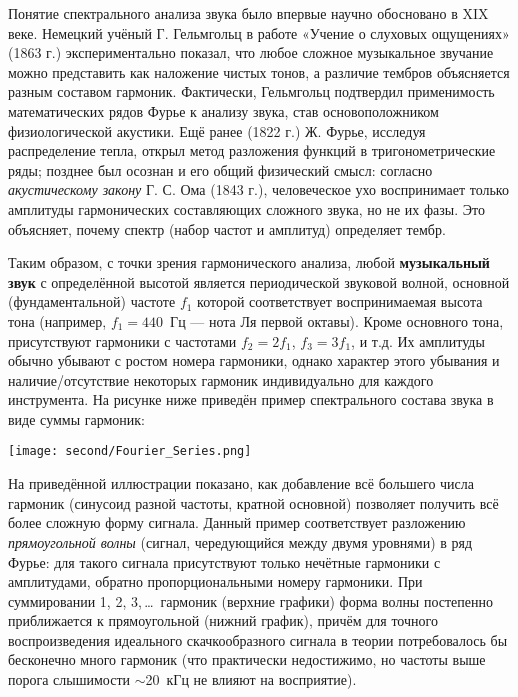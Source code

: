 \documentclass[bachelor, och, diploma]{SCWorks}
\begin{document}
Понятие спектрального анализа звука было впервые научно обосновано в XIX веке. Немецкий учёный Г. Гельмгольц в работе «Учение о слуховых ощущениях» (1863 г.) экспериментально показал, что любое сложное музыкальное звучание можно представить как наложение чистых тонов, а различие тембров объясняется разным составом гармоник\cite{helmholtz}. Фактически, Гельмгольц подтвердил применимость математических рядов Фурье к анализу звука, став основоположником физиологической акустики. Ещё ранее (1822 г.) Ж. Фурье, исследуя распределение тепла, открыл метод разложения функций в тригонометрические ряды; позднее был осознан и его общий физический смысл: согласно \textit{акустическому закону} Г. С. Ома (1843 г.), человеческое ухо воспринимает только амплитуды гармонических составляющих сложного звука, но не их фазы\cite{opp-dsp}. Это объясняет, почему спектр (набор частот и амплитуд) определяет тембр.

Таким образом, с точки зрения гармонического анализа, любой \textbf{музыкальный звук} с определённой высотой является периодической звуковой волной, основной (фундаментальной) частоте $f_1$ которой соответствует воспринимаемая высота тона (например, $f_1=440$~Гц --- нота Ля первой октавы). Кроме основного тона, присутствуют гармоники с частотами $f_2=2f_1$, $f_3=3f_1$, и т.д. Их амплитуды обычно убывают с ростом номера гармоники, однако характер этого убывания и наличие/отсутствие некоторых гармоник индивидуально для каждого инструмента. На рисунке ниже приведён пример спектрального состава звука в виде суммы гармоник:
\begin{center}
\texttt{[image: second/Fourier\_Series.png]}
\end{center}

На приведённой иллюстрации показано, как добавление всё большего числа гармоник (синусоид разной частоты, кратной основной) позволяет получить всё более сложную форму сигнала. Данный пример соответствует разложению \textit{прямоугольной волны} (сигнал, чередующийся между двумя уровнями) в ряд Фурье: для такого сигнала присутствуют только нечётные гармоники с амплитудами, обратно пропорциональными номеру гармоники\cite{opp-dsp}. При суммировании 1, 2, 3,\,\dots\, гармоник (верхние графики) форма волны постепенно приближается к прямоугольной (нижний график), причём для точного воспроизведения идеального скачкообразного сигнала в теории потребовалось бы бесконечно много гармоник (что практически недостижимо, но частоты выше порога слышимости $\sim$20~кГц не влияют на восприятие\cite{opp-dsp}).
\end{document}
